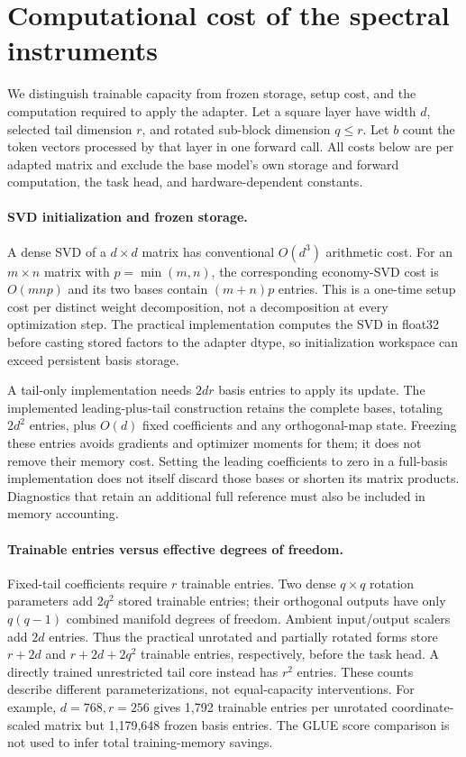 \documentclass{article}
\begin{document}
\section{Computational cost of the spectral instruments}
\label{app:cost}
We distinguish trainable capacity from frozen storage, setup cost, and the computation required to apply the adapter. Let a square layer have width $d$, selected tail dimension $r$, and rotated sub-block dimension $q\le r$. Let $b$ count the token vectors processed by that layer in one forward call. All costs below are per adapted matrix and exclude the base model's own storage and forward computation, the task head, and hardware-dependent constants.

\paragraph{SVD initialization and frozen storage.}
A dense SVD of a $d\times d$ matrix has conventional $O(d^3)$ arithmetic cost. For an $m\times n$ matrix with $p=\min(m,n)$, the corresponding economy-SVD cost is $O(mnp)$ and its two bases contain $(m+n)p$ entries. This is a one-time setup cost per distinct weight decomposition, not a decomposition at every optimization step. The practical implementation computes the SVD in float32 before casting stored factors to the adapter dtype, so initialization workspace can exceed persistent basis storage.

A tail-only implementation needs $2dr$ basis entries to apply its update. The implemented leading-plus-tail construction retains the complete bases, totaling $2d^2$ entries, plus $O(d)$ fixed coefficients and any orthogonal-map state. Freezing these entries avoids gradients and optimizer moments for them; it does not remove their memory cost. Setting the leading coefficients to zero in a full-basis implementation does not itself discard those bases or shorten its matrix products. Diagnostics that retain an additional full reference must also be included in memory accounting.

\paragraph{Trainable entries versus effective degrees of freedom.}
Fixed-tail coefficients require $r$ trainable entries. Two dense $q\times q$ rotation parameters add $2q^2$ stored trainable entries; their orthogonal outputs have only $q(q-1)$ combined manifold degrees of freedom. Ambient input/output scalers add $2d$ entries. Thus the practical unrotated and partially rotated forms store $r+2d$ and $r+2d+2q^2$ trainable entries, respectively, before the task head. A directly trained unrestricted tail core instead has $r^2$ entries. These counts describe different parameterizations, not equal-capacity interventions. For example, $d=768,r=256$ gives 1,792 trainable entries per unrotated coordinate-scaled matrix but 1,179,648 frozen basis entries. The GLUE score comparison is not used to infer total training-memory savings.
\end{document}

